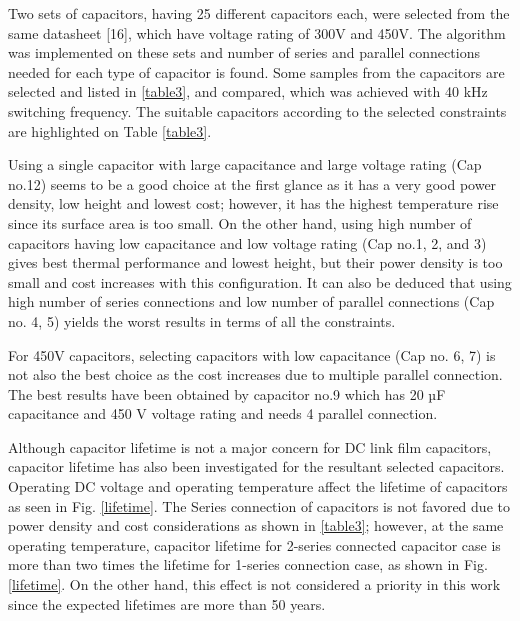 \documentclass[conference,a4paper,twocolumn]{IEEEtran}
\begin{document}
Two sets of capacitors, having 25 different capacitors each, were selected from the same datasheet [16], which have voltage rating of 300V and 450V. The algorithm was implemented on these sets and number of series and parallel connections needed for each type of capacitor is found. Some samples from the capacitors are selected and listed in \ref{table3}, and compared, which was achieved with 40 kHz switching frequency. The suitable capacitors according to the selected constraints are highlighted on Table \ref{table3}.

Using a single capacitor with large capacitance and large voltage rating (Cap no.12) seems to be a good choice at the first glance as it has a very good power density, low height and lowest cost; however, it has the highest temperature rise since its surface area is too small. On the other hand, using high number of capacitors having low capacitance and low voltage rating (Cap no.1, 2, and 3) gives best thermal performance and lowest height, but their power density is too small and cost increases with this configuration. It can also be deduced that using high number of series connections and low number of parallel connections (Cap no. 4, 5) yields the worst results in terms of all the constraints.

For 450V capacitors, selecting capacitors with low capacitance (Cap no. 6, 7) is not also the best choice as the cost increases due to multiple parallel connection. The best results have been obtained by capacitor no.9 which has 20 µF capacitance and 450 V voltage rating and needs 4 parallel connection.

Although capacitor lifetime is not a major concern for DC link film capacitors, capacitor lifetime has also been investigated for the resultant selected capacitors. Operating DC voltage and operating temperature affect the lifetime of capacitors as seen in Fig. \ref{lifetime}. The Series connection of capacitors is not favored due to power density and cost considerations as shown in \ref{table3}; however, at the same operating temperature, capacitor lifetime for 2-series connected capacitor case is more than two times the lifetime for 1-series connection case, as shown in Fig. \ref{lifetime}. On the other hand, this effect is not considered a priority in this work since the expected lifetimes are more than 50 years.
\end{document}
